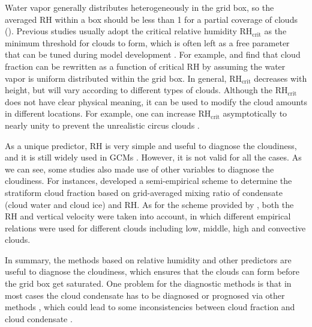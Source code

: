 Water vapor generally distributes heterogeneously in the grid box, so the averaged RH within a box should be less than 1 for a partial coverage of clouds (). Previous studies usually adopt the critical relative humidity $\mathrm{RH}_{\mathrm{crit}}$ as the minimum threshold for clouds to form, which is often left as a free parameter that can be tuned during model development \citep[e.g.,][]{Hourdin2017,Kay2012,Mauritsen2012}. For example, \cite{Sundqvist1978} and \cite{Sundqvist1989} find that cloud fraction can be rewritten as a function of critical RH by assuming the water vapor is uniform distributed within the grid box. In general, $\mathrm{RH}_{\mathrm{crit}}$ decreases with height, but will vary according to different types of clouds. Although the $\mathrm{RH}_{\mathrm{crit}}$ does not have clear physical meaning, it can be used to modify the cloud amounts in different locations. For example, one can increase $\mathrm{RH}_{\mathrm{crit}}$ asymptotically to nearly unity to prevent the unrealistic circus clouds \citep{Sundqvist1989}. 

As a unique predictor, RH is very simple and useful to diagnose the cloudiness, and it is still widely used in GCMs \citep[e.g.,][]{Gordon1992,Park2014,Pope2000}. However, it is not valid for all the cases. As we can see, some studies also made use of other variables to diagnose the cloudiness. For instances, \cite{Xu1996} developed a semi-empirical scheme to determine the stratiform cloud fraction based on grid-averaged mixing ratio of condensate (cloud water and cloud ice) and RH. As for the scheme provided by \cite{Slingo1987}, both the RH and vertical velocity were taken into account, in which different empirical relations were used for different clouds including low, middle, high and convective clouds.

In summary, the methods based on relative humidity and other predictors are useful to diagnose the cloudiness, which ensures that the clouds can form before the grid box get saturated. One problem for the diagnostic methods is that in most cases the cloud condensate has to be diagnosed or prognosed via other methods \citep[e.g.,][]{Zhang2003,Park2014}, which could lead to some inconsistencies between cloud fraction and cloud condensate \citep[e.g.][]{Gregory2002,Tompkins2005}.


